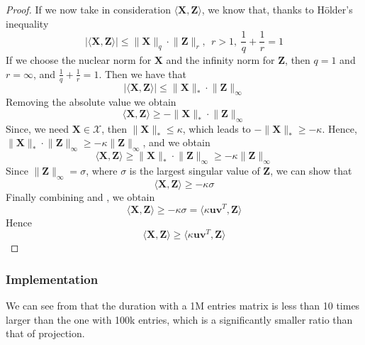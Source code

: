\documentclass[12pt]{article}
\newcommand{\boldZ}{\mathbf{Z}}
\newcommand{\boldX}{\mathbf{X}}
\newcommand{\setX}{\mathcal{X}}
\newcommand{\boldu}{\mathbf{u}}
\newcommand{\boldv}{\mathbf{v}}
\begin{document}
\begin{proof}
If we now take in consideration $\langle \boldX, \boldZ \rangle$, we know that, thanks to H{\"o}lder's inequality
\begin{equation}
    \lvert \langle \boldX, \boldZ \rangle \rvert \leq \lVert \boldX \rVert_{q} \cdot \lVert \boldZ \rVert_{r}, \ \ r > 1, \ \frac{1}{q} + \frac{1}{r} = 1
\end{equation}
If we choose the nuclear norm for $\boldX$ and the infinity norm for $\boldZ$, then $q = 1$ and $r = \infty$, and $\frac{1}{q} + \frac{1}{r} = 1$. Then we have that
\begin{equation}
    \lvert \langle \boldX, \boldZ \rangle \rvert \leq \lVert \boldX \rVert_{*} \cdot \lVert \boldZ \rVert_{\infty}
\end{equation}
Removing the absolute value we obtain
\begin{equation}
    \langle \boldX, \boldZ \rangle \geq - \lVert \boldX \rVert_{*} \cdot \lVert \boldZ \rVert_{\infty}
\end{equation}
Since, we need $\boldX \in \setX$, then $\lVert \boldX \rVert_{*} \leq \kappa$, which leads to $-\lVert \boldX \rVert_{*} \geq -\kappa$. Hence, $\lVert \boldX \rVert_{*} \cdot \lVert \boldZ \rVert_{\infty} \geq -\kappa \lVert \boldZ \rVert_{\infty}$, and we obtain
\begin{equation}
    \langle \boldX, \boldZ \rangle \geq \lVert \boldX \rVert_{*} \cdot \lVert \boldZ \rVert_{\infty} \geq -\kappa \lVert \boldZ \rVert_{\infty}
\end{equation}
Since $\lVert \boldZ \rVert_{\infty} = \sigma$, where $\sigma$ is the largest singular value of $\boldZ$, we can show that
\begin{equation} \label{eq:inner-x-z}
    \langle \boldX, \boldZ \rangle \geq - \kappa \sigma
\end{equation}
Finally combining  and , we obtain
\begin{equation}
    \langle \boldX, \boldZ \rangle \geq - \kappa \sigma = \langle \kappa \boldu \boldv^T, \boldZ \rangle
\end{equation}
Hence
\begin{equation}
    \langle \boldX, \boldZ \rangle \geq \langle \kappa \boldu \boldv^T, \boldZ \rangle
\end{equation}
\end{proof}

\subsubsection{Implementation}
We can see from  that the duration with a 1M entries matrix is less than 10 times larger than the one with 100k entries, which is a significantly smaller ratio than that of projection.
\end{document}
